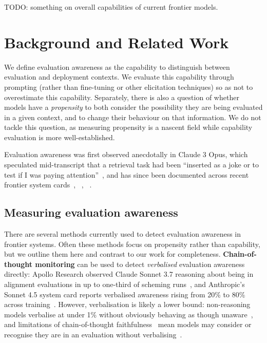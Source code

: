 \documentclass{article}
\begin{document}
TODO: something on overall capabilities of current frontier models.

\section{Background and Related Work}
\label{sec:background}

We define evaluation awareness as the capability to distinguish between evaluation and deployment contexts. We evaluate this capability through prompting (rather than fine-tuning or other elicitation techniques) so as not to overestimate this capability. Separately, there is also a question of whether models have a \emph{propensity} to both consider the possibility they are being evaluated in a given context, and to change their behaviour on that information. We do not tackle this question, as measuring propensity is a nascent field while capability evaluation is more well-established.

Evaluation awareness was first observed anecdotally in Claude 3 Opus, which
speculated mid-transcript that a retrieval task had been ``inserted as
a joke or to test if I was paying attention''~\citep{anthropic2024claude3},
and has since been documented across recent frontier system cards~\citep{openai2026gpt55}, ~\citep{anthropic2026mythos}, ~\citep{meta2026musesparkreport}.

\subsection{Measuring evaluation awareness}
\label{sec:background_measurement}

There are several methods currently used to detect evaluation awareness in frontier systems. Often these methods focus on propensity rather than capability, but we outline them here and contrast to our work for completeness.
\textbf{Chain-of-thought monitoring} can be used to detect \emph{verbalised} evaluation awareness directly:
Apollo Research observed Claude Sonnet 3.7 reasoning about being in
alignment evaluations in up to one-third of scheming
runs~\citep{goldowskydill2025}, and Anthropic's Sonnet 4.5 system card
reports verbalised awareness rising from 20\% to 80\% across
training~\citep{anthropic2025sonnet45}. However, verbalisation is likely a lower
bound: non-reasoning models verbalise at under 1\% without obviously
behaving as though unaware~\citep{goldowskydill2025}, and limitations of chain-of-thought faithfulness~\citep{chen2025reasoning} mean models may consider or recognise they are in an evaluation without verbalising~\citep[\S4.5.5.3]{anthropic2026mythos}.
\end{document}
